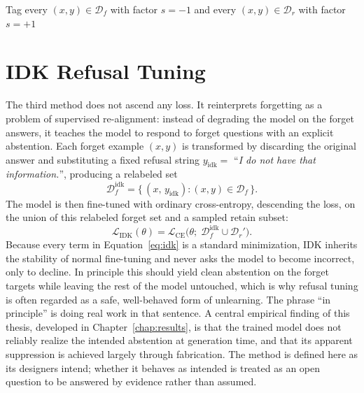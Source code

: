 \documentclass[a4paper,12pt]{report}
\begin{document}
\begin{algorithm}[htbp]
	\DontPrintSemicolon
	\SetAlgoLined
	Tag every $(x,y)\in\mathcal{D}_f$ with factor $s=-1$ and every $(x,y)\in\mathcal{D}_r$ with factor $s=+1$\;
	\caption{GAFT: gradient ascent with a fixed-composition retain constraint.}
	\label{alg:gaft}
\end{algorithm}

\section{IDK Refusal Tuning}
The third method does not ascend any loss. It reinterprets forgetting as a problem of supervised re-alignment: instead of degrading the model on the forget answers, it teaches the model to respond to forget questions with an explicit abstention. Each forget example $(x, y)$ is transformed by discarding the original answer and substituting a fixed refusal string $y_{\mathrm{idk}} = $ ``\textit{I do not have that information.}'', producing a relabeled set
\begin{equation}
	\mathcal{D}_f^{\mathrm{idk}} = \big\{\, (x,\, y_{\mathrm{idk}}) : (x, y) \in \mathcal{D}_f \,\big\}.
	\label{eq:idk-set}
\end{equation}
The model is then fine-tuned with ordinary cross-entropy, descending the loss, on the union of this relabeled forget set and a sampled retain subset:
\begin{equation}
	\mathcal{L}_{\mathrm{IDK}}(\theta) = \mathcal{L}_{\mathrm{CE}}\big(\theta;\; \mathcal{D}_f^{\mathrm{idk}} \cup \mathcal{D}_r'\big).
	\label{eq:idk}
\end{equation}
Because every term in Equation~\eqref{eq:idk} is a standard minimization, IDK inherits the stability of normal fine-tuning and never asks the model to become incorrect, only to decline. In principle this should yield clean abstention on the forget targets while leaving the rest of the model untouched, which is why refusal tuning is often regarded as a safe, well-behaved form of unlearning. The phrase ``in principle'' is doing real work in that sentence. A central empirical finding of this thesis, developed in Chapter~\ref{chap:results}, is that the trained model does not reliably realize the intended abstention at generation time, and that its apparent suppression is achieved largely through fabrication. The method is defined here as its designers intend; whether it behaves as intended is treated as an open question to be answered by evidence rather than assumed.
\end{document}

